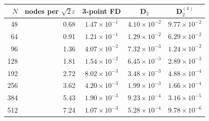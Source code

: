 \begin{tabular}{rr ccc}
\toprule
$N$ & nodes per $\sqrt2\varepsilon$ & 3-point FD & $\mathbf D_2$ & $\mathbf D_2^{(4)}$\\
\midrule
48 & 0.68 & $1.47{\times}10^{-1}$ & $4.10{\times}10^{-2}$ & $9.77{\times}10^{-2}$\\
64 & 0.91 & $1.21{\times}10^{-1}$ & $1.29{\times}10^{-2}$ & $6.29{\times}10^{-2}$\\
96 & 1.36 & $4.07{\times}10^{-2}$ & $7.32{\times}10^{-3}$ & $1.24{\times}10^{-2}$\\
128 & 1.81 & $1.54{\times}10^{-2}$ & $6.45{\times}10^{-3}$ & $2.89{\times}10^{-3}$\\
192 & 2.72 & $8.02{\times}10^{-3}$ & $3.48{\times}10^{-3}$ & $4.88{\times}10^{-4}$\\
256 & 3.62 & $4.20{\times}10^{-3}$ & $1.99{\times}10^{-3}$ & $1.66{\times}10^{-4}$\\
384 & 5.43 & $1.90{\times}10^{-3}$ & $9.23{\times}10^{-4}$ & $3.16{\times}10^{-5}$\\
512 & 7.24 & $1.07{\times}10^{-3}$ & $5.28{\times}10^{-4}$ & $9.78{\times}10^{-6}$\\
\bottomrule
\end{tabular}
